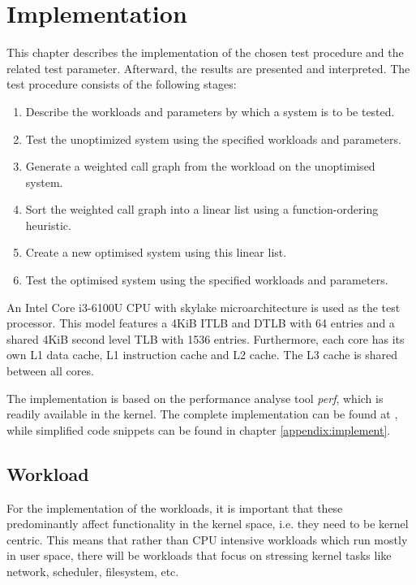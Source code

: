 \chapter{Implementation}\label{chapt:implement}

This chapter describes the implementation of the chosen test procedure and the related test parameter. Afterward, the results are presented and interpreted. The test procedure consists of the following stages:

\begin{enumerate}\addtocounter{enumi}{-1}
    \itemsep-1.3em 
    \item Describe the workloads and parameters by which a system is to be tested.
    \item Test the unoptimized system using the specified workloads and parameters.
    \item Generate a weighted call graph from the workload on the unoptimised system.
    \item Sort the weighted call graph into a linear list using a function-ordering heuristic.
    \item Create a new optimised system using this linear list.
    \item Test the optimised system using the specified workloads and parameters.
\end{enumerate}

An Intel Core i3-6100U CPU with skylake microarchitecture is used as the test processor. This model features a 4KiB ITLB and DTLB with 64 entries and a shared 4KiB second level TLB with 1536 entries. Furthermore, each core has its own L1 data cache, L1 instruction cache and L2 cache. The L3 cache is shared between all cores. \cite{cpuinfo} 

The implementation is based on the performance analyse tool \textit{perf}, which is readily available in the kernel. The complete implementation can be found at \cite{github}, while simplified code snippets can be found in chapter \ref{appendix:implement}.

\vspace{-\baselineskip}

\section{Workload}

\enlargethispage{2\baselineskip}
For the implementation of the workloads, it is important that these predominantly affect functionality in the kernel space, i.e. they need to be kernel centric. This means that rather than CPU intensive workloads which run mostly in user space, there will be workloads that focus on stressing kernel tasks like network, scheduler, filesystem, etc.

